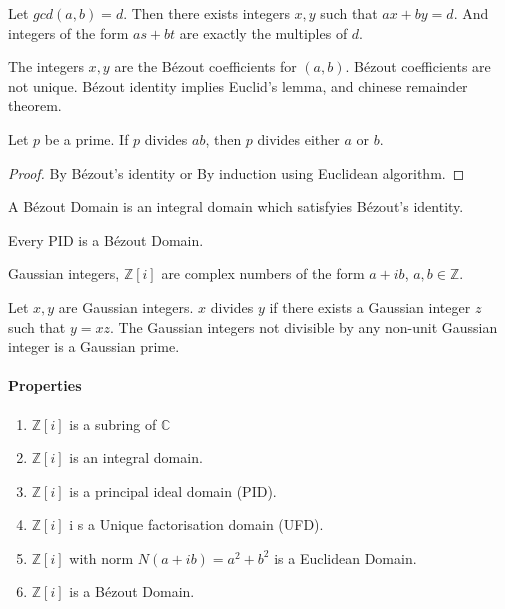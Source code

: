 \begin{lemma}[B\'ezout]
	Let $gcd(a,b) = d$. Then there exists integers $x,y$ such that $ax+by = d$. And integers of the form $as+bt$ are exactly the multiples of $d$.
\end{lemma}

	The integers $x,y$ are the B\'ezout coefficients for $(a,b)$. B\'ezout coefficients are not unique.
	B\'ezout identity implies Euclid's lemma, and chinese remainder theorem.

\begin{lemma}[Euclid]
	Let $p$ be a prime. If $p$ divides $ab$, then $p$ divides either $a$ or $b$.
\end{lemma}
\begin{proof}
	By B\'ezout's identity or By induction using Euclidean algorithm.
\end{proof}

\begin{theorem}

\end{theorem}

\begin{definition}
	A B\'ezout Domain is an integral domain which satisfyies B\'ezout's identity.
\end{definition}
	Every PID is a B\'ezout Domain.

\begin{definition}
	Gaussian integers, $\mathbb{Z}[i]$ are complex numbers of the form $a+ib$, $a,b \in \mathbb{Z}$.
\end{definition}

	Let $x,y$ are Gaussian integers. $x$ divides $y$ if there exists a Gaussian integer $z$ such that $y = xz$.
	The Gaussian integers not divisible by any non-unit Gaussian integer is a Gaussian prime.
\paragraph{Properties}
	\begin{enumerate}
		\item $\mathbb{Z}[i]$ is a subring of $\mathbb{C}$
		\item $\mathbb{Z}[i]$ is an integral domain.
		\item $\mathbb{Z}[i]$ is a principal ideal domain (PID).
		\item $\mathbb{Z}[i]$ i s a Unique factorisation domain (UFD).
		\item $\mathbb{Z}[i]$ with norm $N(a+ib) = a^2+b^2$ is a Euclidean Domain.
		\item $\mathbb{Z}[i]$ is a B\'ezout Domain.
	\end{enumerate}

